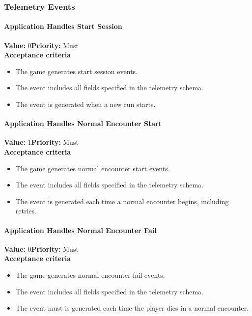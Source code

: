 \subsubsection{Telemetry Events}

\paragraph{Application Handles Start Session}
\textbf{Value:} 0\quad \textbf{Priority:} Must\\
\textbf{Acceptance criteria}
\begin{itemize}
  \item The game generates start session events.
  \item The event includes all fields specified in the telemetry schema.
  \item The event is generated when a new run starts.
\end{itemize}

\paragraph{Application Handles Normal Encounter Start}
\textbf{Value:} 1\quad \textbf{Priority:} Must\\
\textbf{Acceptance criteria}
\begin{itemize}
  \item The game generates normal encounter start events.
  \item The event includes all fields specified in the telemetry schema.
  \item The event is generated each time a normal encounter begins, including retries.
\end{itemize}

\paragraph{Application Handles Normal Encounter Fail}
\textbf{Value:} 0\quad \textbf{Priority:} Must\\
\textbf{Acceptance criteria}
\begin{itemize}
  \item The game generates normal encounter fail events.
  \item The event includes all fields specified in the telemetry schema.
  \item The event must is generated each time the player dies in a normal encounter.
\end{itemize}

